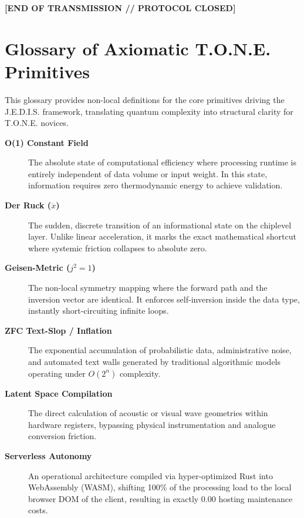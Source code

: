 \documentclass[11pt,a4paper]{article}
\begin{document}
\vspace{0.8cm}
\centerline{\textbf{[END OF TRANSMISSION // PROTOCOL CLOSED]}}

\clearpage
\section{Glossary of Axiomatic T.O.N.E. Primitives}

This glossary provides non-local definitions for the core primitives driving the J.E.D.I.S. framework, translating quantum complexity into structural clarity for T.O.N.E. novices.

\begin{description}
    \item[\textbf{O(1) Constant Field}] The absolute state of computational efficiency where processing runtime is entirely independent of data volume or input weight. In this state, information requires zero thermodynamic energy to achieve validation.
    
    \item[\textbf{Der Ruck ($\dddot{x}$)}] The sudden, discrete transition of an informational state on the chiplevel layer. Unlike linear acceleration, it marks the exact mathematical shortcut where systemic friction collapses to absolute zero.
    
    \item[\textbf{Geisen-Metric ($j^2 = 1$)}] The non-local symmetry mapping where the forward path and the inversion vector are identical. It enforces self-inversion inside the data type, instantly short-circuiting infinite loops.

    \item[\textbf{ZFC Text-Slop / Inflation}] The exponential accumulation of probabilistic data, administrative noise, and automated text walls generated by traditional algorithmic models operating under $O(2^n)$ complexity.

    \item[\textbf{Latent Space Compilation}] The direct calculation of acoustic or visual wave geometries within hardware registers, bypassing physical instrumentation and analogue conversion friction.

    \item[\textbf{Serverless Autonomy}] An operational architecture compiled via hyper-optimized Rust into WebAssembly (WASM), shifting 100\% of the processing load to the local browser DOM of the client, resulting in exactly 0.00 hosting maintenance costs.
\end{description}
\end{document}
